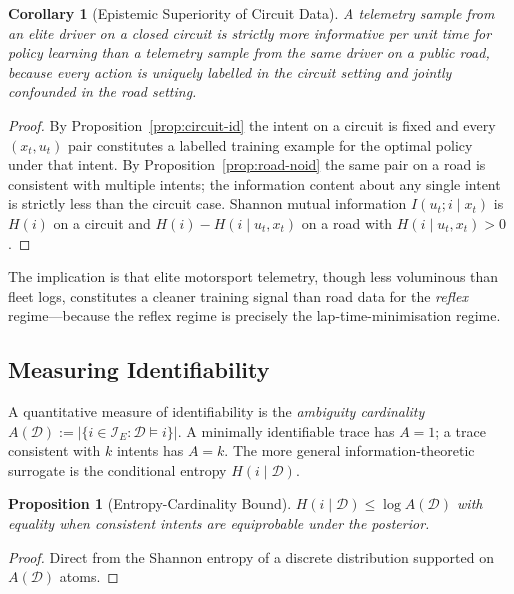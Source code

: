 \documentclass[11pt,twocolumn]{article}
\newtheorem{proposition}[theorem]{Proposition}
\newtheorem{corollary}[theorem]{Corollary}
\theoremstyle{definition}
\theoremstyle{remark}
\newcommand{\cI}{\mathcal{I}}
\begin{document}
\begin{corollary}[Epistemic Superiority of Circuit Data]\label{cor:epistemic}
A telemetry sample from an elite driver on a closed circuit is strictly more informative per unit time for policy learning than a telemetry sample from the same driver on a public road, because every action is uniquely labelled in the circuit setting and jointly confounded in the road setting.
\end{corollary}

\begin{proof}
By Proposition~\ref{prop:circuit-id} the intent on a circuit is fixed and every $(x_t, u_t)$ pair constitutes a labelled training example for the optimal policy under that intent. By Proposition~\ref{prop:road-noid} the same pair on a road is consistent with multiple intents; the information content about any single intent is strictly less than the circuit case. Shannon mutual information $I(u_t; i \mid x_t)$ is $H(i)$ on a circuit and $H(i) - H(i \mid u_t, x_t)$ on a road with $H(i \mid u_t, x_t) > 0$.
\end{proof}

The implication is that elite motorsport telemetry, though less voluminous than fleet logs, constitutes a cleaner training signal than road data for the \emph{reflex} regime---because the reflex regime is precisely the lap-time-minimisation regime.

\subsection{Measuring Identifiability}

A quantitative measure of identifiability is the \emph{ambiguity cardinality} $A(\mathcal{D}) := |\{i \in \cI_E : \mathcal{D} \models i\}|$. A minimally identifiable trace has $A = 1$; a trace consistent with $k$ intents has $A = k$. The more general information-theoretic surrogate is the conditional entropy $H(i \mid \mathcal{D})$.

\begin{proposition}[Entropy-Cardinality Bound]\label{prop:ent-card}
$H(i \mid \mathcal{D}) \le \log A(\mathcal{D})$ with equality when consistent intents are equiprobable under the posterior.
\end{proposition}

\begin{proof}
Direct from the Shannon entropy of a discrete distribution supported on $A(\mathcal{D})$ atoms.
\end{proof}
\end{document}
